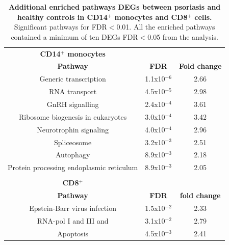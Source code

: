 \begin{table}[htbp]
\renewcommand{\arraystretch}{0.7}
\centering
\begin{tabular}{@{}c c c}
\toprule
\textbf{CD14$^+$ monocytes} & & \\
\textbf{Pathway} & \textbf{FDR} & \textbf{Fold change} \\
\midrule
Generic transcription              & 1.1x10$^{-6}$ & 2.66\\
RNA transport                      & 4.5x10$^{-5}$ & 2.98\\
GnRH signalling                    & 2.4x10$^{-4}$ & 3.61\\
Ribosome biogenesis in eukaryotes  & 3.0x10$^{-4}$ & 3.42\\
Neurotrophin signaling             & 4.0x10$^{-4}$ & 2.96 \\
Spliceosome                        & 3.2x10$^{-3}$ & 2.51 \\
Autophagy                          & 8.9x10$^{-3}$ & 2.18\\
Protein processing endoplasmic reticulum & 8.9x10$^{-3}$ & 2.05\\
 & & \\
\midrule
\midrule
\textbf{CD8$^+$} & & \\
\textbf{Pathway} & \textbf{FDR} & \textbf{fold change}\\
\midrule
Epstein-Barr virus infection & 1.5x10$^{-2}$ & 2.33 \\
RNA-pol I and III and        & 3.1x10$^{-2}$ & 2.79\\
Apoptosis                    & 4.5x10$^{-3}$ & 2.41 \\
\bottomrule
\end{tabular}
\medskip %
\caption[Additional enriched pathways for DEGs between psoriasis and healthy controls in CD14$^+$ monocytes and CD8$^+$ cells.]{\textbf{Additional enriched pathways DEGs between psoriasis and healthy controls in CD14$^+$ monocytes and CD8$^+$ cells.} Significant pathways for FDR$<$0.01. All the enriched pathways contained a minimum of ten DEGs FDR$<$0.05 from the analysis.}
\label{tab:RNAseq_PS_CTL_additional_pathways}
\end{table}

